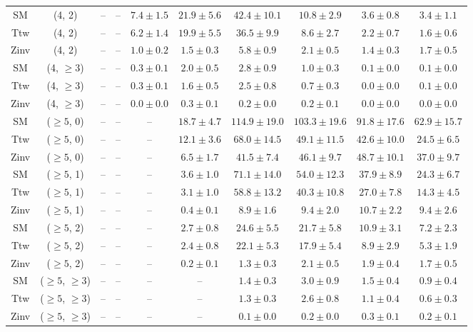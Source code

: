 \begin{table}[h!]
{\begin{tabular}{cccccccccc}
	SM & (4, 2) & -- & -- & $7.4\pm 1.5$ & $21.9\pm 5.6$ & $42.4\pm 10.1$ & $10.8\pm 2.9$ & $3.6\pm 0.8$ & $3.4\pm 1.1$ \\[0.5ex] 
	Ttw & (4, 2) & -- & -- & $6.2\pm 1.4$ & $19.9\pm 5.5$ & $36.5\pm 9.9$ & $8.6\pm 2.7$ & $2.2\pm 0.7$ & $1.6\pm 0.6$ \\[0.5ex] 
	Zinv & (4, 2) & -- & -- & $1.0\pm 0.2$ & $1.5\pm 0.3$ & $5.8\pm 0.9$ & $2.1\pm 0.5$ & $1.4\pm 0.3$ & $1.7\pm 0.5$ \\[0.5ex] 
	SM & (4, $\ge3$) & -- & -- & $0.3\pm 0.1$ & $2.0\pm 0.5$ & $2.8\pm 0.9$ & $1.0\pm 0.3$ & $0.1\pm 0.0$ & $0.1\pm 0.0$ \\[0.5ex] 
	Ttw & (4, $\ge3$) & -- & -- & $0.3\pm 0.1$ & $1.6\pm 0.5$ & $2.5\pm 0.8$ & $0.7\pm 0.3$ & $0.0\pm 0.0$ & $0.1\pm 0.0$ \\[0.5ex] 
	Zinv & (4, $\ge3$) & -- & -- & $0.0\pm 0.0$ & $0.3\pm 0.1$ & $0.2\pm 0.0$ & $0.2\pm 0.1$ & $0.0\pm 0.0$ & $0.0\pm 0.0$ \\[0.5ex] 
	SM & ($\ge5$, 0) & -- & -- & -- & $18.7\pm 4.7$ & $114.9\pm 19.0$ & $103.3\pm 19.6$ & $91.8\pm 17.6$ & $62.9\pm 15.7$ \\[0.5ex] 
	Ttw & ($\ge5$, 0) & -- & -- & -- & $12.1\pm 3.6$ & $68.0\pm 14.5$ & $49.1\pm 11.5$ & $42.6\pm 10.0$ & $24.5\pm 6.5$ \\[0.5ex] 
	Zinv & ($\ge5$, 0) & -- & -- & -- & $6.5\pm 1.7$ & $41.5\pm 7.4$ & $46.1\pm 9.7$ & $48.7\pm 10.1$ & $37.0\pm 9.7$ \\[0.5ex] 
	SM & ($\ge5$, 1) & -- & -- & -- & $3.6\pm 1.0$ & $71.1\pm 14.0$ & $54.0\pm 12.3$ & $37.9\pm 8.9$ & $24.3\pm 6.7$ \\[0.5ex] 
	Ttw & ($\ge5$, 1) & -- & -- & -- & $3.1\pm 1.0$ & $58.8\pm 13.2$ & $40.3\pm 10.8$ & $27.0\pm 7.8$ & $14.3\pm 4.5$ \\[0.5ex] 
	Zinv & ($\ge5$, 1) & -- & -- & -- & $0.4\pm 0.1$ & $8.9\pm 1.6$ & $9.4\pm 2.0$ & $10.7\pm 2.2$ & $9.4\pm 2.6$ \\[0.5ex] 
	SM & ($\ge5$, 2) & -- & -- & -- & $2.7\pm 0.8$ & $24.6\pm 5.5$ & $21.7\pm 5.8$ & $10.9\pm 3.1$ & $7.2\pm 2.3$ \\[0.5ex] 
	Ttw & ($\ge5$, 2) & -- & -- & -- & $2.4\pm 0.8$ & $22.1\pm 5.3$ & $17.9\pm 5.4$ & $8.9\pm 2.9$ & $5.3\pm 1.9$ \\[0.5ex] 
	Zinv & ($\ge5$, 2) & -- & -- & -- & $0.2\pm 0.1$ & $1.3\pm 0.3$ & $2.1\pm 0.5$ & $1.9\pm 0.4$ & $1.7\pm 0.5$ \\[0.5ex] 
	SM & ($\ge5$, $\ge3$) & -- & -- & -- & -- & $1.4\pm 0.3$ & $3.0\pm 0.9$ & $1.5\pm 0.4$ & $0.9\pm 0.4$ \\[0.5ex] 
	Ttw & ($\ge5$, $\ge3$) & -- & -- & -- & -- & $1.3\pm 0.3$ & $2.6\pm 0.8$ & $1.1\pm 0.4$ & $0.6\pm 0.3$ \\[0.5ex] 
	Zinv & ($\ge5$, $\ge3$) & -- & -- & -- & -- & $0.1\pm 0.0$ & $0.2\pm 0.0$ & $0.3\pm 0.1$ & $0.2\pm 0.1$ \\[0.5ex] 
	\hline
	\hline
\end{tabular}}
\end{table}
